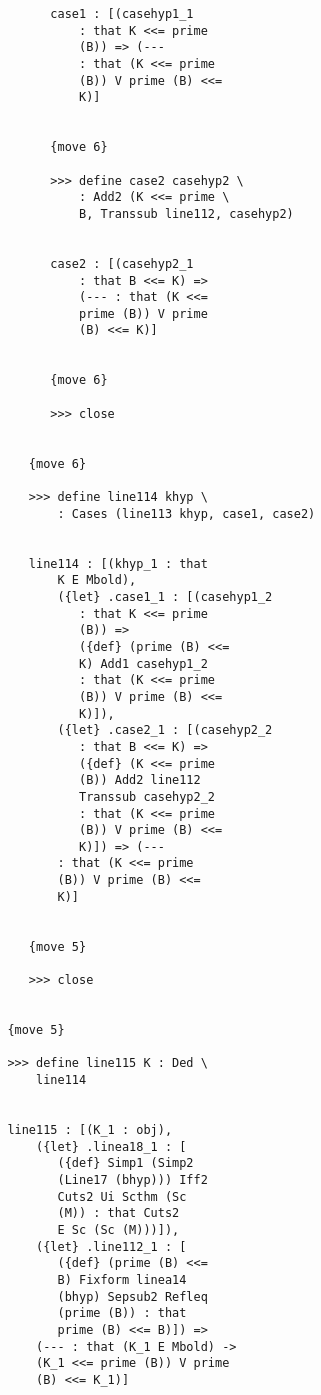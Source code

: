 \documentclass[12pt]{article}
\begin{document}
\begin{verbatim}
                     case1 : [(casehyp1_1 
                         : that K <<= prime 
                         (B)) => (--- 
                         : that (K <<= prime 
                         (B)) V prime (B) <<= 
                         K)]


                     {move 6}

                     >>> define case2 casehyp2 \
                         : Add2 (K <<= prime \
                         B, Transsub line112, casehyp2)


                     case2 : [(casehyp2_1 
                         : that B <<= K) => 
                         (--- : that (K <<= 
                         prime (B)) V prime 
                         (B) <<= K)]


                     {move 6}

                     >>> close


                  {move 6}

                  >>> define line114 khyp \
                      : Cases (line113 khyp, case1, case2)


                  line114 : [(khyp_1 : that 
                      K E Mbold), 
                      ({let} .case1_1 : [(casehyp1_2 
                         : that K <<= prime 
                         (B)) => 
                         ({def} (prime (B) <<= 
                         K) Add1 casehyp1_2 
                         : that (K <<= prime 
                         (B)) V prime (B) <<= 
                         K)]), 
                      ({let} .case2_1 : [(casehyp2_2 
                         : that B <<= K) => 
                         ({def} (K <<= prime 
                         (B)) Add2 line112 
                         Transsub casehyp2_2 
                         : that (K <<= prime 
                         (B)) V prime (B) <<= 
                         K)]) => (--- 
                      : that (K <<= prime 
                      (B)) V prime (B) <<= 
                      K)]


                  {move 5}

                  >>> close


               {move 5}

               >>> define line115 K : Ded \
                   line114


               line115 : [(K_1 : obj), 
                   ({let} .linea18_1 : [
                      ({def} Simp1 (Simp2 
                      (Line17 (bhyp))) Iff2 
                      Cuts2 Ui Scthm (Sc 
                      (M)) : that Cuts2 
                      E Sc (Sc (M)))]), 
                   ({let} .line112_1 : [
                      ({def} (prime (B) <<= 
                      B) Fixform linea14 
                      (bhyp) Sepsub2 Refleq 
                      (prime (B)) : that 
                      prime (B) <<= B)]) => 
                   (--- : that (K_1 E Mbold) -> 
                   (K_1 <<= prime (B)) V prime 
                   (B) <<= K_1)]



\end{verbatim}
\end{document}
